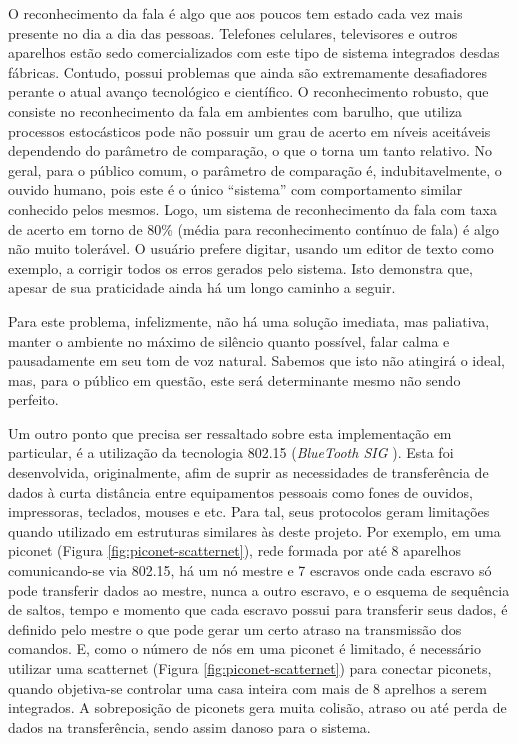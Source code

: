 \documentclass[12pt,a4paper,oneside]{report}
\begin{document}
O reconhecimento da fala é algo que aos poucos tem estado cada vez mais presente no dia a dia das pessoas. Telefones celulares, televisores e outros aparelhos estão sedo comercializados com este tipo de sistema integrados desdas fábricas. Contudo, possui problemas que ainda são extremamente desafiadores perante o atual avanço tecnológico e científico. O reconhecimento robusto, que consiste no reconhecimento da fala em ambientes com barulho, que utiliza processos estocásticos pode não possuir um grau de acerto em níveis aceitáveis dependendo do parâmetro de comparação, o que o torna um tanto relativo. No geral, para o público comum, o parâmetro de comparação é, indubitavelmente, o ouvido humano, pois este é o único ``sistema'' com comportamento similar conhecido pelos mesmos. Logo, um sistema de reconhecimento da fala com taxa de acerto em torno de 80\% (média para reconhecimento contínuo de fala) é algo não muito tolerável. O usuário prefere digitar, usando um editor de texto como exemplo, a corrigir todos os erros gerados pelo sistema. Isto demonstra que, apesar de sua praticidade ainda há um longo caminho a seguir.

Para este problema, infelizmente, não há uma solução imediata, mas paliativa, manter o ambiente no máximo de silêncio quanto possível, falar calma e pausadamente em seu tom de voz natural. Sabemos que isto não atingirá o ideal, mas, para o público em questão, este será determinante mesmo não sendo perfeito.

Um outro ponto que precisa ser ressaltado sobre esta implementação em particular, é a utilização da tecnologia 802.15 (\emph{BlueTooth SIG} \cite{bluetooth}). Esta foi desenvolvida, originalmente, afim de suprir as necessidades de transferência de dados à curta distância entre equipamentos pessoais como fones de ouvidos, impressoras, teclados, mouses e etc. Para tal, seus protocolos geram limitações quando utilizado em estruturas similares às deste projeto. Por exemplo, em uma piconet (Figura \ref{fig:piconet-scatternet}), rede formada por até 8 aparelhos comunicando-se via 802.15, há um nó mestre e 7 escravos onde cada escravo só pode transferir dados ao mestre, nunca a outro escravo, e o esquema de sequência de saltos, tempo e momento que cada escravo possui para transferir seus dados, é definido pelo mestre o que pode gerar um certo atraso na transmissão dos comandos. E, como o número de nós em uma piconet é limitado, é necessário utilizar uma scatternet (Figura \ref{fig:piconet-scatternet}) para conectar piconets, quando objetiva-se controlar uma casa inteira com mais de 8 aprelhos a serem integrados. A sobreposição de piconets gera muita colisão, atraso ou até perda de dados na transferência, sendo assim danoso para o sistema.
\end{document}
